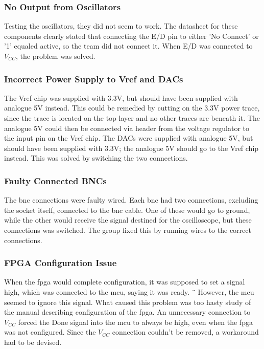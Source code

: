 \subsubsection{No Output from Oscillators}
Testing the oscillators, they did not seem to work.
The datasheet for these components clearly stated that connecting the E/D pin to either 'No Connect' or '1' equaled active, so the team did not connect it.
When E/D was connected to \(V_{CC}\), the problem was solved.

\subsubsection{Incorrect Power Supply to Vref and DACs}
The Vref chip was supplied with 3.3V, but should have been supplied with analogue 5V instead.
This could be remedied by cutting on the 3.3V power trace, since the trace is located on the top layer and no other traces are beneath it.
The analogue 5V could then be connected via header from the voltage regulator to the input pin on the Vref chip.
\newline
The DACs were supplied with analogue 5V, but should have been supplied with 3.3V; the analogue 5V should go to the Vref chip instead.
This was solved by switching the two connections.

\subsubsection{Faulty Connected BNCs}
The \gls{bnc} connections were faulty wired.
Each \gls{bnc} had two connections, excluding the socket itself, connected to the \gls{bnc} cable.
One of these would go to ground, while the other would receive the signal destined for the oscilloscope, but these connections was switched.
The group fixed this by running wires to the correct connections.

\subsubsection{FPGA Configuration Issue}
When the \gls{fpga} would complete configuration, it was supposed to set a signal high, which was connected to the \gls{mcu}, saying it was ready. ¨
However, the \gls{mcu} seemed to ignore this signal.
What caused this problem was too hasty study of the manual describing configuration of the \gls{fpga}.
An unnecessary connection to \(V_{CC}\) forced the Done signal into the \gls{mcu} to always be high, even when the \gls{fpga} was not configured.
Since the \(V_{CC}\) connection couldn't be removed, a workaround had to be devised.

